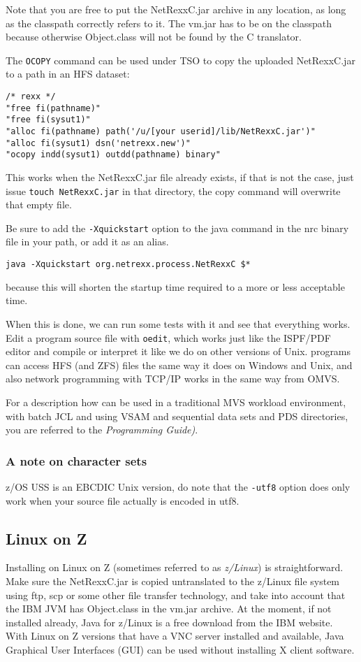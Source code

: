 Note that you are free to put the NetRexxC.jar archive in any
location, as long as the classpath correctly refers to it. The vm.jar
has to be on the classpath because otherwise Object.class will not be
found by the \nr{}C translator.

The \texttt{OCOPY} command can be used under TSO to copy the uploaded
NetRexxC.jar to a path in an HFS dataset:
\begin{verbatim}
/* rexx */                                             
"free fi(pathname)"                                    
"free fi(sysut1)"                                      
"alloc fi(pathname) path('/u/[your userid]/lib/NetRexxC.jar')"
"alloc fi(sysut1) dsn('netrexx.new')"                  
"ocopy indd(sysut1) outdd(pathname) binary"            
\end{verbatim}
This works when the NetRexxC.jar file already exists, if that is not the
case, just issue \texttt{touch NetRexxC.jar} in that directory, the
copy command will overwrite that empty file.

Be sure to add the \texttt{-Xquickstart} option to the java command in
the nrc binary file in your path, or add it as an alias.
\begin{verbatim}
java -Xquickstart org.netrexx.process.NetRexxC $*
\end{verbatim}
because this will shorten the startup time required to a more or less
acceptable time.

When this is done, we can run some tests with it and see that
everything works. Edit a program source file with \texttt{oedit},
which works just like the ISPF/PDF editor and compile or interpret it
like we do on other versions of Unix. \nr{} programs can access HFS (and
ZFS) files the same way it does on Windows and Unix, and also network
programming with TCP/IP works in the same way from OMVS.

For a description how \nr{} can be used in a traditional MVS
workload environment, with batch JCL and using VSAM and sequential
data sets and PDS directories, you are referred to the \emph{\nr{}
  Programming Guide)}.
\subsubsection{A note on character sets}
z/OS USS is an EBCDIC Unix version, do note that the \texttt{-utf8}
option does only work when your source file actually is encoded in
utf8.
\subsection{Linux on Z}
Installing on Linux on Z (sometimes referred to as \emph{z/Linux}) is straightforward. Make sure the NetRexxC.jar
is copied untranslated to the z/Linux file system using ftp, scp or
some other file transfer technology, and take into
account that the IBM JVM has Object.class in the vm.jar archive. At
the moment, if not installed already, Java for z/Linux is a free download from the IBM website. With
Linux on Z versions that have a VNC server installed and available, Java
Graphical User Interfaces (GUI) can be used without installing X client software. 